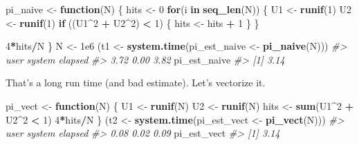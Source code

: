 \documentclass[]{book}
\newenvironment{Shaded}{\begin{snugshade}}{\end{snugshade}}
\newcommand{\KeywordTok}[1]{\textcolor[rgb]{0.13,0.29,0.53}{\textbf{#1}}}
\newcommand{\DecValTok}[1]{\textcolor[rgb]{0.00,0.00,0.81}{#1}}
\newcommand{\FloatTok}[1]{\textcolor[rgb]{0.00,0.00,0.81}{#1}}
\newcommand{\StringTok}[1]{\textcolor[rgb]{0.31,0.60,0.02}{#1}}
\newcommand{\CommentTok}[1]{\textcolor[rgb]{0.56,0.35,0.01}{\textit{#1}}}
\newcommand{\ControlFlowTok}[1]{\textcolor[rgb]{0.13,0.29,0.53}{\textbf{#1}}}
\newcommand{\OperatorTok}[1]{\textcolor[rgb]{0.81,0.36,0.00}{\textbf{#1}}}
\newcommand{\NormalTok}[1]{#1}
\begin{document}
\begin{Shaded}
\begin{Highlighting}[]
\NormalTok{pi_naive <-}\StringTok{ }\ControlFlowTok{function}\NormalTok{(N) \{}
\NormalTok{  hits <-}\StringTok{ }\DecValTok{0}
  \ControlFlowTok{for}\NormalTok{(i }\ControlFlowTok{in} \KeywordTok{seq_len}\NormalTok{(N)) \{}
\NormalTok{    U1 <-}\StringTok{ }\KeywordTok{runif}\NormalTok{(}\DecValTok{1}\NormalTok{)}
\NormalTok{    U2 <-}\StringTok{ }\KeywordTok{runif}\NormalTok{(}\DecValTok{1}\NormalTok{)}
    \ControlFlowTok{if}\NormalTok{ ((U1}\OperatorTok{^}\DecValTok{2} \OperatorTok{+}\StringTok{ }\NormalTok{U2}\OperatorTok{^}\DecValTok{2}\NormalTok{) }\OperatorTok{<}\StringTok{ }\DecValTok{1}\NormalTok{) \{}
\NormalTok{      hits <-}\StringTok{ }\NormalTok{hits }\OperatorTok{+}\StringTok{ }\DecValTok{1}
\NormalTok{    \}}
\NormalTok{  \}}
  
  \DecValTok{4}\OperatorTok{*}\NormalTok{hits}\OperatorTok{/}\NormalTok{N}
\NormalTok{\}}
\NormalTok{N <-}\StringTok{ }\FloatTok{1e6}
\NormalTok{(t1 <-}\StringTok{ }\KeywordTok{system.time}\NormalTok{(pi_est_naive <-}\StringTok{ }\KeywordTok{pi_naive}\NormalTok{(N)))}
\CommentTok{#>    user  system elapsed }
\CommentTok{#>    3.72    0.00    3.82}
\NormalTok{pi_est_naive}
\CommentTok{#> [1] 3.14}
\end{Highlighting}
\end{Shaded}

That's a long run time (and bad estimate). Let's vectorize it.

\begin{Shaded}
\begin{Highlighting}[]
\NormalTok{pi_vect <-}\StringTok{ }\ControlFlowTok{function}\NormalTok{(N) \{}
\NormalTok{  U1 <-}\StringTok{ }\KeywordTok{runif}\NormalTok{(N)}
\NormalTok{  U2 <-}\StringTok{ }\KeywordTok{runif}\NormalTok{(N)}
\NormalTok{  hits <-}\StringTok{ }\KeywordTok{sum}\NormalTok{(U1}\OperatorTok{^}\DecValTok{2} \OperatorTok{+}\StringTok{ }\NormalTok{U2}\OperatorTok{^}\DecValTok{2} \OperatorTok{<}\StringTok{ }\DecValTok{1}\NormalTok{)}
  \DecValTok{4}\OperatorTok{*}\NormalTok{hits}\OperatorTok{/}\NormalTok{N}
\NormalTok{\}}
\NormalTok{(t2 <-}\StringTok{ }\KeywordTok{system.time}\NormalTok{(pi_est_vect <-}\StringTok{ }\KeywordTok{pi_vect}\NormalTok{(N)))}
\CommentTok{#>    user  system elapsed }
\CommentTok{#>    0.08    0.02    0.09}
\NormalTok{pi_est_vect}
\CommentTok{#> [1] 3.14}
\end{Highlighting}
\end{Shaded}
\end{document}
